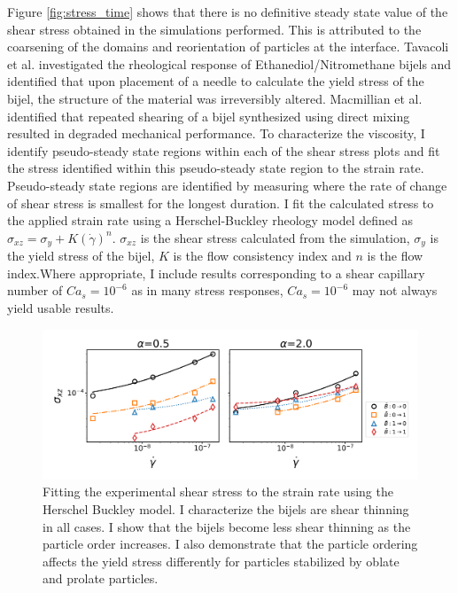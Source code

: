 Figure \ref{fig:stress_time} shows that there is no definitive steady state value of the shear stress obtained in the simulations performed. This is
attributed to the coarsening of the domains and reorientation of particles at the interface. \cite{tavacoli_novel_2011,macmillan_rheological_2019} 
Tavacoli et al. investigated the rheological response of Ethanediol/Nitromethane bijels and identified that upon placement of a needle to calculate the yield
stress of the bijel, the structure of the material was irreversibly altered. \cite{tavacoli_novel_2011} Macmillian et al. identified that repeated 
shearing of a bijel synthesized using direct mixing resulted in degraded mechanical performance. \cite{macmillan_rheological_2019}
To characterize the viscosity, I identify pseudo-steady state regions within each of the shear stress plots and fit the stress identified within this 
pseudo-steady state region to the strain rate. Pseudo-steady state regions are identified by measuring where the rate of change of shear stress is 
smallest for the longest duration. I fit the calculated stress to the applied strain rate using a Herschel-Buckley rheology model defined as
$\sigma_{xz} = \sigma_{y} + K(\dot{\gamma})^{n}$. $\sigma_{xz}$ is the shear stress calculated from the simulation, $\sigma_{y}$ is the yield stress of the bijel, 
$K$ is the flow consistency index and $n$ is the flow index.Where appropriate, I include results corresponding to a shear capillary number of 
$Ca_s = 10^{-6}$ as in many stress responses, $Ca_s = 10^{-6}$ may not always yield usable results. 

\begin{figure} 
    \centering 
    \includegraphics[scale=0.4]{../figures/results/paper3/stress_strain-all.png} 
    \caption{Fitting the experimental shear stress to the strain rate using the Herschel Buckley model. I characterize the bijels are 
             shear thinning in all cases. I show that the bijels become less shear thinning as the particle order increases. I also
             demonstrate that the particle ordering affects the yield stress differently for particles stabilized by oblate and 
             prolate particles.} 
    \label{fig:stress_strain} 
\end{figure}

